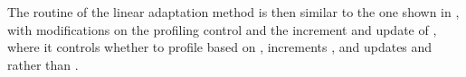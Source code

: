 The routine of the linear adaptation method is then similar to the one shown in , with modifications on the profiling control and the increment and update of , where it controls whether to profile based on , increments , and updates  and  rather than . 



